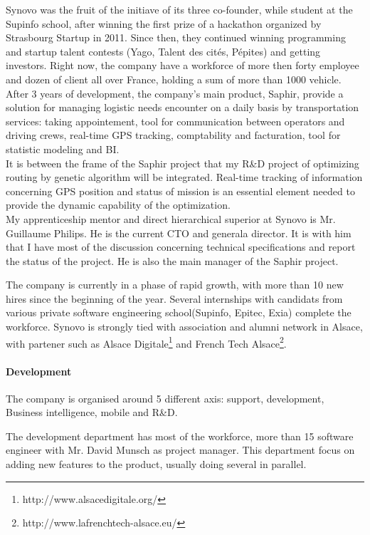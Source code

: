 \documentclass[12pt]{memoir}
\begin{document}
Synovo was the fruit of the initiave of its three co-founder, while student at the
Supinfo school, after winning the first prize of a hackathon organized by Strasbourg
Startup in 2011. Since then, they continued winning programming and startup talent
contests (Yago, Talent des cités, Pépites) and getting investors. Right now, the
company have a workforce of more then forty employee and dozen of client all over
France, holding a sum of more than 1000 vehicle. \\
After 3 years of development, the company's main product, Saphir, provide a solution
for managing logistic needs encounter on a daily basis by transportation services:
  taking appointement, tool for communication between operators and driving crews,
  real-time GPS tracking, comptability and facturation, tool for statistic modeling and BI. \\ 
It is between the frame of the Saphir project that my R\&D project of optimizing routing by genetic algorithm will be integrated. Real-time tracking of information concerning GPS position and status of mission is an essential element needed to provide the dynamic capability of the optimization.\\
My apprenticeship mentor and direct hierarchical superior at Synovo is Mr. Guillaume Philips.
He is the current CTO and generala director. It is with him that I have most of the discussion concerning technical specifications and report the status of the project. He is also the main manager of the Saphir project.

\bigskip
The company is currently in a phase of rapid growth, with more than 10 new hires
since the beginning of the year. Several internships with candidats from various
private software engineering school(Supinfo, Epitec, Exia) complete the workforce.
Synovo is strongly tied with association and alumni network in Alsace, with partener
such as Alsace Digitale\footnote{http://www.alsacedigitale.org/} and French Tech
Alsace\footnote{http://www.lafrenchtech-alsace.eu/}.

\paragraph{Development }\label{duxe9veloppement}

The company is organised around 5 different axis: support, development, Business intelligence, mobile and R\&D.

The development department has most of the workforce, more than 15 software engineer with Mr. David Munsch as project manager. This department focus on adding new features to the product, usually doing several in parallel.
\end{document}
